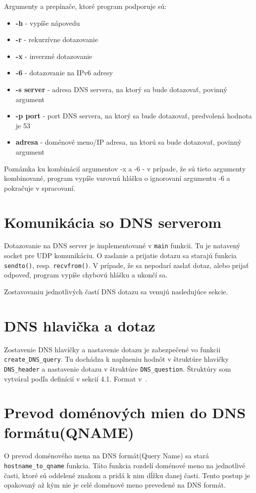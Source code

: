 Argumenty a prepínače, ktoré program podporuje sú:
\begin{itemize}
    \item \textbf{-h} - vypíše nápovedu
    \item \textbf{-r} - rekurzívne dotazovanie
    \item \textbf{-x} - inverzné dotazovanie
    \item \textbf{-6} - dotazovanie na IPv6 adresy
    \item \textbf{-s server} - adresa DNS servera, na ktorý sa bude dotazovať, povinný argument
    \item \textbf{-p port} - port DNS servera, na ktorý sa bude dotazovať, predvolená hodnota je 53
    \item \textbf{adresa} - doménové meno/IP adresa, na ktorú sa bude dotazovať, povinný argument
\end{itemize}

Poznámka ku kombinácií argumentov -x a -6 - v prípade, že sú tieto argumenty kombinované, program vypíše varovnú hlášku o ignorovaní argumentu -6 a pokračuje v spracovaní.

\section{Komunikácia so DNS serverom}
Dotazovanie na DNS server je implementované v \texttt{main} funkcii. Tu je natavený socket pre UDP komunikáciu. O zaslanie a prijatie dotazu sa starajú funkcia \texttt{sendto()}, resp. \texttt{recvfrom()}. V prípade, že sa nepodarí zaslať dotaz, alebo prijať odpoveď, program vypíše chybovú hlášku a ukončí sa.

Zostavovaniu jednotlivých častí DNS dotazu sa venujú nasledujúce sekcie.

\section{DNS hlavička a dotaz}
Zostavenie DNS hlavičky a nastavenie dotazu je zabezpečené vo funkcii \texttt{create\_DNS\_query}. Tu dochádza k naplneniu hodnôt v štruktúre hlavičky \texttt{DNS\_header} a nastavenie dotazu v štruktúre \texttt{DNS\_question}. Štruktúry som vytváral podľa definícií v sekcií 4.1. Format v~\cite{RFC1035}.

\section{Prevod doménových mien do DNS formátu(QNAME)}
O prevod doménového mena na DNS formát(Query Name) sa stará \texttt{hostname\_to\_qname} funkcia. Táto funkcia rozdelí doménové meno na jednotlivé časti, ktoré sú oddelené znakom  a pridá k nim dĺžku danej časti. Tento postup je opakovaný až kým nie je celé doménové meno prevedené na DNS formát.

